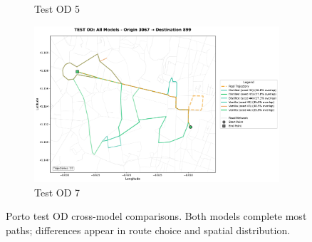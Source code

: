 \begin{figure}[H]
\begin{subfigure}{0.49\linewidth}
        \caption{Test OD 5}
    \end{subfigure}
    \begin{subfigure}{0.49\linewidth}
        \centering
        \includegraphics[width=\linewidth]{assets/plots/eval/porto/cross_model/test/test_od_comparison_7_origin3067_dest899.pdf}
        \caption{Test OD 7}
    \end{subfigure}
    \caption{Porto test OD cross-model comparisons. Both models complete most paths; differences appear in route choice and spatial distribution.}
    \label{fig:appendix-porto-cross-test}
\end{figure}

